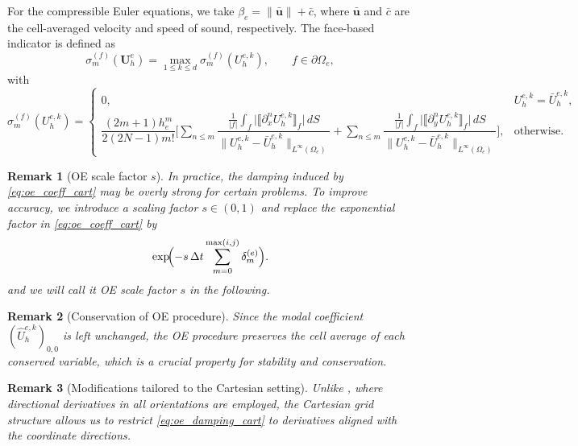 \documentclass[fleqn,11pt]{amsart}
\newtheorem{remark}{Remark}[section]
\begin{document}
For the compressible Euler equations, we take
$\beta_e = \|\bar{\bm u}\| + \bar c$, where $\bar{\bm u}$ and $\bar c$
are the cell-averaged velocity and speed of sound, respectively.
The face-based indicator is defined as
\begin{equation}
\label{eq:oe_sigma_face}
\sigma_m^{(f)}(\bm U_h^e)
=
\max_{1\le k\le d}
\sigma_m^{(f)}(U_h^{e,k}),
\qquad f\in\partial\Omega_e,
\end{equation}
with
\begin{equation}
\label{eq:oe_damping_cart}
\sigma_m^{(f)}(U_h^{e,k})
=
\begin{cases}
0,
& U_h^{e,k} = \bar U_h^{e,k}, \\[1.2ex]
\dfrac{(2m+1)h_e^{m}}{2(2N-1)m!}
\Biggl[
\displaystyle
\sum_{n\le m}
\dfrac{
\frac{1}{|f|}
\int_f
\bigl|
\llbracket \partial_x^n U_h^{e,k} \rrbracket_f
\bigr|
\, dS
}{
\|U_h^{e,k}-\bar U_h^{e,k}\|_{L^\infty(\Omega_e)}
}
+
\sum_{n\le m}
\dfrac{
\frac{1}{|f|}
\int_f
\bigl|
\llbracket \partial_y^n U_h^{e,k} \rrbracket_f
\bigr|
\, dS
}{
\|U_h^{e,k}-\bar U_h^{e,k}\|_{L^\infty(\Omega_e)}
}
\Biggr],
& \text{otherwise}.
\end{cases}
\end{equation}

\begin{remark}[OE scale factor $s$] 
In practice, the damping induced by
\eqref{eq:oe_coeff_cart} may be overly strong for certain problems.
To improve accuracy, we introduce a scaling factor $s\in(0,1)$ and
replace the exponential factor in \eqref{eq:oe_coeff_cart} by
\begin{equation}
\label{eq:oe scale factor}
   \exp\!\Bigl(
- s\,\Delta t \sum_{m=0}^{\max(i,j)} \delta_m^{(e)}
\Bigr). 
\end{equation}
and we will call it OE scale factor $s$ in the following.
\end{remark}

\begin{remark}[Conservation of OE procedure]
Since the modal coefficient $(\hat U_h^{e,k})_{0,0}$ is left unchanged,
the OE procedure preserves the cell average of each conserved
variable, which is a crucial property for stability and conservation.
\end{remark}

\begin{remark}[Modifications tailored to the Cartesian setting]
Unlike \cite{peng2025oedg}, where directional derivatives in all
orientations are employed, the Cartesian grid structure allows us to
restrict \eqref{eq:oe_damping_cart} to derivatives aligned with the
coordinate directions.
\end{remark}
\end{document}

